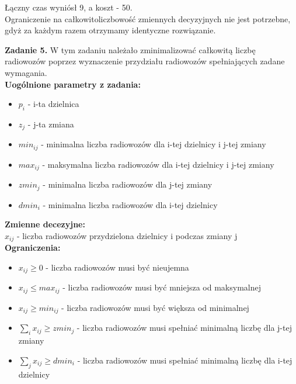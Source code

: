 \documentclass[15pt, a4paper]{article}
\begin{document}
Łączny czas wyniósł 9, a koszt - 50.\\

Ograniczenie na całkowitoliczbowość zmiennych decyzyjnych nie jest potrzebne, gdyż za każdym razem otrzymamy identyczne rozwiązanie. 

\vspace{0.5cm}

\noindent\hrulefill

\vspace{0.5cm}


\noindent\textbf{Zadanie 5.} W tym zadaniu należało zminimalizować całkowitą liczbę radiowozów poprzez wyznaczenie przydziału radiowozów spełniających zadane wymagania.\\

\noindent\textbf{Uogólnione parametry z zadania:}

\begin{itemize}
    \item \( p_i \) - i-ta dzielnica
    \item \( z_j \) - j-ta zmiana
    \item \( min_{ij} \) - minimalna liczba radiowozów dla i-tej dzielnicy i j-tej zmiany
    \item \( max_{ij} \) - maksymalna liczba radiowozów dla i-tej dzielnicy i j-tej zmiany
    \item \( zmin_{j} \) - minimalna liczba radiowozów dla j-tej zmiany 
    \item \( dmin_{i} \) - minimalna liczba radiowozów dla i-tej dzielnicy
\end{itemize}

\noindent\textbf{Zmienne decezyjne:}\\

\(x_{ij}\) - liczba radiowozów przydzielona dzielnicy i podczas zmiany j\\

\noindent\textbf{Ograniczenia:}

\begin{itemize}
    \item \(x_{ij} \geq 0 \) - liczba radiowozów musi być nieujemna
    \item \( x_{ij} \leq max_{ij} \) - liczba radiowozów musi być mniejsza od maksymalnej
    \item \( x_{ij} \geq min_{ij} \) - liczba radiowozów musi być większa od minimalnej
    \item \(\sum_{i}x_{ij} \geq zmin_j \) - liczba radiowozów musi spełniać minimalną liczbę dla j-tej zmiany
    \item \(\sum_{j}x_{ij} \geq dmin_i \) - liczba radiowozów musi spełniać minimalną liczbę dla i-tej dzielnicy
\end{itemize}
\end{document}

